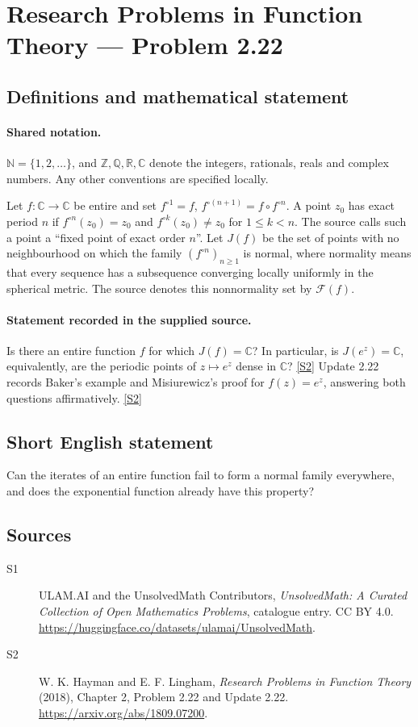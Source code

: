 \documentclass[11pt]{article}
\newcommand{\sref}[2]{\hyperlink{source:#1:#2}{[S#2]}}
\begin{document}
\section{Research Problems in Function Theory — Problem 2.22}\label{statement}

\subsection{Definitions and mathematical statement}

\paragraph{Shared notation.}$\mathbb N=\{1,2,\ldots\}$, and $\mathbb Z,\mathbb Q,\mathbb R,\mathbb C$ denote the integers, rationals, reals and complex numbers. Any other conventions are specified locally.


Let $f:\mathbb C\to\mathbb C$ be entire and set $f^{\circ1}=f$, $f^{\circ(n+1)}=f\circ f^{\circ n}$.
A point $z_0$ has exact period $n$ if $f^{\circ n}(z_0)=z_0$ and $f^{\circ k}(z_0)\ne z_0$ for $1\le k<n$.
The source calls such a point a ``fixed point of exact order $n$''.
Let $J(f)$ be the set of points with no neighbourhood on which the family $(f^{\circ n})_{n\ge1}$ is normal, where normality means that every sequence has a subsequence converging locally uniformly in the spherical metric. The source denotes this nonnormality set by $\mathcal F(f)$.

\paragraph{Statement recorded in the supplied source.}
Is there an entire function $f$ for which $J(f)=\mathbb C$? In particular, is $J(e^z)=\mathbb C$, equivalently, are the periodic points of $z\mapsto e^z$ dense in $\mathbb C$? \sref{statement}{2}
Update 2.22 records Baker's example and Misiurewicz's proof for $f(z)=e^z$, answering both questions affirmatively. \sref{statement}{2}
\subsection{Short English statement}
Can the iterates of an entire function fail to form a normal family everywhere, and does the exponential function already have this property?
\subsection{Sources}
\begin{description}
\item[\hypertarget{source:statement:1}{S1}] ULAM.AI and the UnsolvedMath Contributors, \emph{UnsolvedMath: A Curated Collection of Open Mathematics Problems}, catalogue entry. CC BY 4.0. \url{https://huggingface.co/datasets/ulamai/UnsolvedMath}.
\item[\hypertarget{source:statement:2}{S2}] W. K. Hayman and E. F. Lingham, \emph{Research Problems in Function Theory} (2018), Chapter 2, Problem 2.22 and Update 2.22. \url{https://arxiv.org/abs/1809.07200}.
\end{description}
\label{end:statement}
\end{document}
